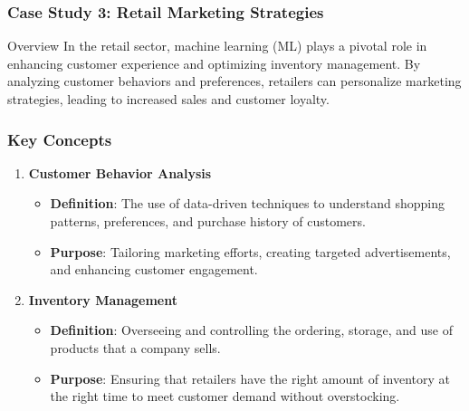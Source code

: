 \documentclass{beamer}
\begin{document}
\begin{frame}[fragile]
    \frametitle{Case Study 3: Retail Marketing Strategies}
    \begin{block}{Overview}
        In the retail sector, machine learning (ML) plays a pivotal role in enhancing customer experience and optimizing inventory management.
        By analyzing customer behaviors and preferences, retailers can personalize marketing strategies, leading to increased sales and customer loyalty.
    \end{block}
\end{frame}

\begin{frame}[fragile]
    \frametitle{Key Concepts}
    \begin{enumerate}
        \item \textbf{Customer Behavior Analysis}
        \begin{itemize}
            \item \textbf{Definition}: The use of data-driven techniques to understand shopping patterns, preferences, and purchase history of customers.
            \item \textbf{Purpose}: Tailoring marketing efforts, creating targeted advertisements, and enhancing customer engagement.
        \end{itemize}
        
        \item \textbf{Inventory Management}
        \begin{itemize}
            \item \textbf{Definition}: Overseeing and controlling the ordering, storage, and use of products that a company sells.
            \item \textbf{Purpose}: Ensuring that retailers have the right amount of inventory at the right time to meet customer demand without overstocking.
        \end{itemize}
    \end{enumerate}
\end{frame}
\end{document}
